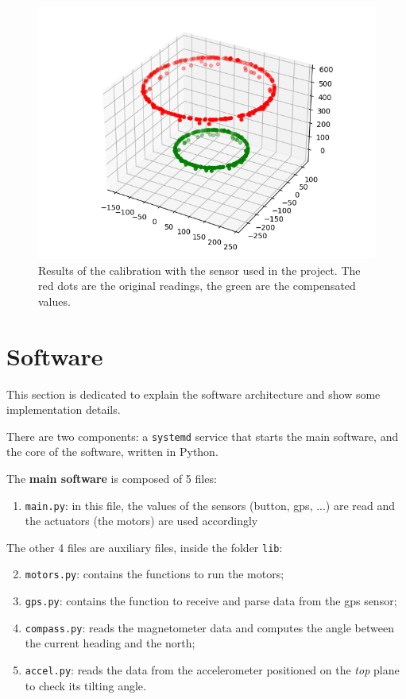 \documentclass[]{article}
\begin{document}
\begin{figure}[H]
	\centering
	\includegraphics[width=0.7\linewidth]{images/electronic/mycalibration.png}
	\caption{Results of the calibration with the sensor used in the project. The red dots are the original readings, the green are the compensated values.\\}
\end{figure}

\newpage	
\section{Software}\label{sec:software}
This section is dedicated to explain the software architecture and show some implementation details. 

There are two components: a \texttt{systemd} service that starts the main software, and the core of the software, written in Python. 

The \textbf{main software} is composed of 5 files: 
\begin{enumerate}
	\item \texttt{main.py}: in this file, the values of the sensors (button, gps, ...) are read and the actuators (the motors) are used accordingly
\end{enumerate}

The other 4 files are auxiliary files, inside the folder \texttt{lib}:

\begin{enumerate}
	\setcounter{enumi}{1}
	\item \texttt{motors.py}: contains the functions to run the motors;
	\item \texttt{gps.py}: contains the function to receive and parse data from the gps sensor;
	\item \texttt{compass.py}: reads the magnetometer data and computes the angle between the current heading and the north;
	\item \texttt{accel.py}: reads the data from the accelerometer positioned on the \textit{top} plane to check its tilting angle. 
\end{enumerate}
\end{document}
